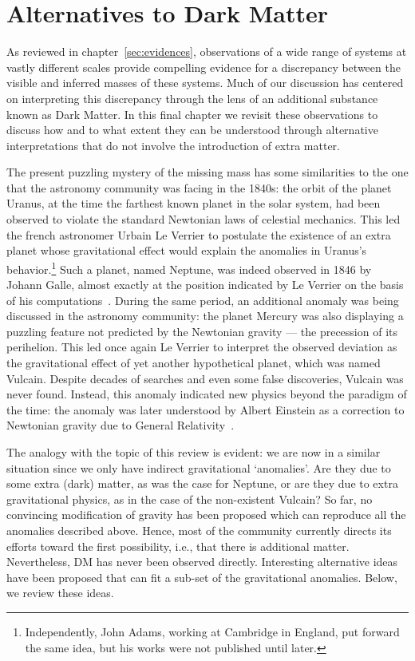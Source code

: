 \chapter{Alternatives to Dark Matter}
\label{sec:MOND}
 
As reviewed in chapter~\ref{sec:evidences}, observations of a wide range of systems at vastly different scales provide compelling evidence for a discrepancy between the visible and inferred masses of these systems. Much of our discussion has centered on interpreting this discrepancy through the lens of an additional substance known as Dark Matter. In this final chapter we revisit these observations to discuss how and to what extent they can be understood through alternative interpretations that do not involve the introduction of extra matter.

The present puzzling mystery of the missing mass has some similarities to the one that the astronomy community was facing in the 1840s: the orbit of the planet Uranus, at the time the farthest known  planet in the solar system, had been observed to violate the standard Newtonian laws of celestial mechanics. 
This led 
the french astronomer Urbain Le Verrier
to postulate the existence of an extra planet whose gravitational effect would explain the anomalies in Uranus's behavior.\footnote{Independently, 
John Adams, working at Cambridge in England, put forward the same idea, but his works were not published until later.}
Such a planet, named Neptune, was indeed observed in 1846 by 
Johann Galle, 
almost exactly at the position indicated by Le Verrier on the basis of his computations~\cite{Neptune}.
During the same period, an additional anomaly was being discussed in the astronomy community: the planet Mercury was also displaying a puzzling feature not predicted by the Newtonian gravity --- the precession of its perihelion. This led once again Le Verrier to interpret the observed deviation as the gravitational effect of yet another hypothetical planet, which was named Vulcain. 
Despite decades of searches and even some false discoveries, Vulcain was never found.
Instead, this anomaly indicated new physics beyond the paradigm of the time:
the anomaly was later understood by Albert Einstein as a correction to Newtonian gravity due to General Relativity~\cite{Vulcain}.

\smallskip

The analogy with the topic of this review is evident: we are now in a similar situation since we only have indirect gravitational `anomalies'.
Are they due to some extra (dark) matter, as was the case for Neptune, or are they due to extra gravitational physics, as in the case of the non-existent Vulcain? So far, no convincing modification of gravity has been proposed which can reproduce all the anomalies described above. Hence, most of the community currently directs its efforts toward the first possibility, i.e., that there is additional matter.
Nevertheless, DM has never been observed directly.
Interesting alternative ideas have been proposed that can fit a sub-set of the gravitational anomalies. Below, we review these ideas.







